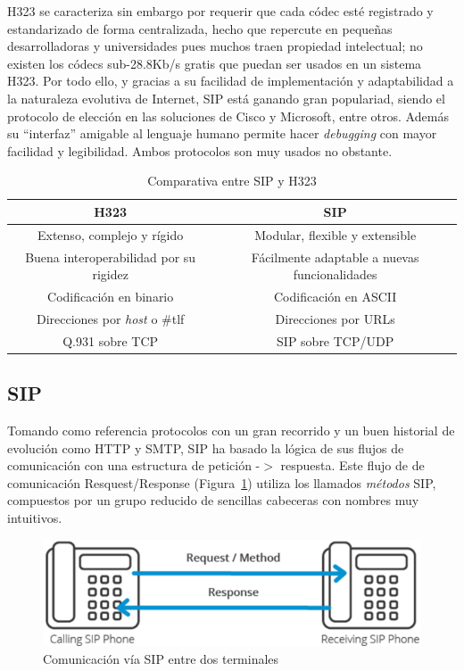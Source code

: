 \documentclass[a4paper, 12pt]{book}
\begin{document}
H323 se caracteriza sin embargo por requerir que cada códec esté registrado y estandarizado de forma centralizada, hecho que repercute en pequeñas desarrolladoras y universidades pues muchos traen propiedad intelectual; no existen los códecs sub-28.8Kb/s gratis que puedan ser usados en un sistema H323. Por todo ello, y gracias a su facilidad de implementación y adaptabilidad a la naturaleza evolutiva de Internet, SIP está ganando gran populariad, siendo el protocolo de elección en las soluciones de Cisco y Microsoft, entre otros. Además su  ``interfaz'' amigable al lenguaje humano permite hacer \emph{debugging} con mayor facilidad y legibilidad. 
Ambos protocolos son muy usados no obstante.
\\

\begin{table} [h]
  \begin{center}
    \begin{tabular}{| c | c |}
    \hline
    \textbf{H323} & \textbf{SIP} \\ \hline
    Extenso, complejo y rígido & Modular, flexible y extensible\\\hline
    Buena interoperabilidad por su rigidez & Fácilmente adaptable a nuevas funcionalidades\\\hline
    Codificación en binario & Codificación en ASCII \\\hline
    Direcciones por \emph{host} o \#tlf & Direcciones por URLs \\ \hline
    Q.931 sobre TCP & SIP sobre TCP/UDP \\\hline
    \end{tabular}
    \label{tabla:SIPvsH323}
    \caption{Comparativa entre SIP y H323}
  \end{center}
\end{table}
\subsection{SIP}
\label{sec:sip}
Tomando como referencia protocolos con un gran recorrido y un buen historial de evolución como HTTP y SMTP, SIP ha basado la lógica de sus flujos de comunicación con una estructura de petición -$>$ respuesta. Este flujo de de comunicación Resquest/Response (Figura~\ref{figura:fig_phones}) utiliza los llamados \emph{métodos} SIP, compuestos por un grupo reducido de sencillas cabeceras con nombres muy intuitivos.

\begin{figure}[h]
  \centering
  \includegraphics{img/fig_phones}
  \caption{Comunicación vía SIP entre dos terminales}
  \label{figura:fig_phones}
\end{figure}
\end{document}
